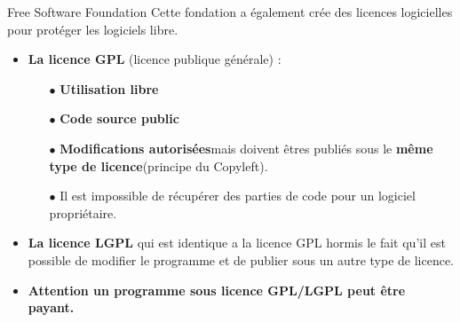 \begin{frame}[t,fragile]{Free Software Foundation}
     Cette fondation a également crée des licences logicielles pour protéger les logiciels libre. \pause
        \begin{itemize}
            \item \textbf{La licence GPL} (licence publique générale) : \pause
            \begin{itemize}
                \fontsize{9.5}{11}\selectfont
                \item[$\bullet$] \textbf{Utilisation libre} \pause
                \item[$\bullet$] \textbf {Code source public} \pause
                \item[$\bullet$] \textbf{Modifications autorisées}\linebreak mais doivent êtres publiés sous le \textbf{même type de licence}\linebreak (principe du Copyleft).\pause
                \item[$\bullet$] Il est impossible de récupérer des parties de code pour un logiciel propriétaire. \pause
            \end{itemize}
            \item \textbf{La licence LGPL} qui est identique a la licence GPL hormis le fait qu’il est possible de modifier le programme et de publier sous un autre type de licence.\pause
            \item \textbf{Attention un programme sous licence GPL/LGPL peut être payant.} 
        \end{itemize}
\end{frame}

